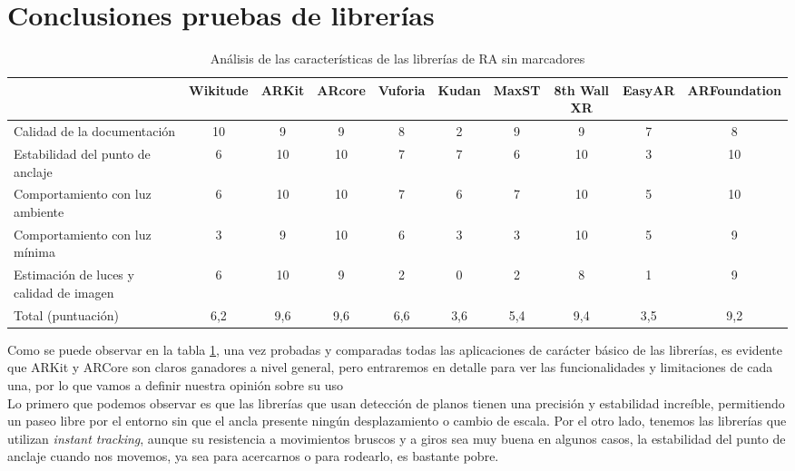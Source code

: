 \section{Conclusiones pruebas de librerías}
\begin{table}[H]
\resizebox{\textwidth}{!} {
    \centering
    \begin{tabular}{|m{3cm}|c|c|c|c|c|c|c|c|c|}
    \hline
    &Wikitude&	ARKit &	ARcore & Vuforia & Kudan &	MaxST  & 8th Wall XR & EasyAR & ARFoundation\\
     \hline
         Calidad de la documentación 	& 10 & 9 & 9 & 8 &2 & 9 & 9 &  7 & 8 \\
  \hline
Estabilidad del punto de anclaje 		& 6 & 10 & 10 & 7 & 7 & 6 &  10  & 3 & 10 \\
 \hline
Comportamiento con luz ambiente   & 6 & 10 & 10& 7 & 6 & 7 & 10  & 5 & 10\\
 \hline
Comportamiento con luz mínima     & 3 &  9 & 10 & 6 & 3 & 3& 10 & 5 & 9\\
 \hline
Estimación de luces y calidad de imagen & 6 & 10 & 9 & 2  & 0  & 2 & 8 & 1 &9\\
 \hline
Total (puntuación) & 6,2 & 9,6 & 9,6  & 6,6 &    3,6   &   5,4     &  9,4     &     3,5        &  9,2          \\
\hline
    \end{tabular}
}
    \caption{Análisis de las características de las librerías de RA sin marcadores}
    \label{tab:my_label}
\end{table}

Como se puede observar en la tabla \ref{tab:my_label}, una vez probadas y comparadas todas las aplicaciones de carácter básico de las librerías, es evidente que ARKit y ARCore son claros ganadores a nivel general, pero entraremos en detalle para ver las funcionalidades y limitaciones de cada una, por lo que vamos a definir nuestra opinión sobre su uso\\

Lo primero que podemos observar es que las librerías que usan detección de planos tienen una precisión y estabilidad increíble, permitiendo un paseo libre por el entorno sin que el ancla presente ningún desplazamiento o cambio de escala. Por el otro lado, tenemos las librerías que utilizan \textit{instant tracking}, aunque su resistencia a movimientos bruscos y a giros sea muy buena en algunos casos, la estabilidad del punto de anclaje cuando nos movemos, ya sea para acercarnos o para rodearlo, es bastante pobre.\\

